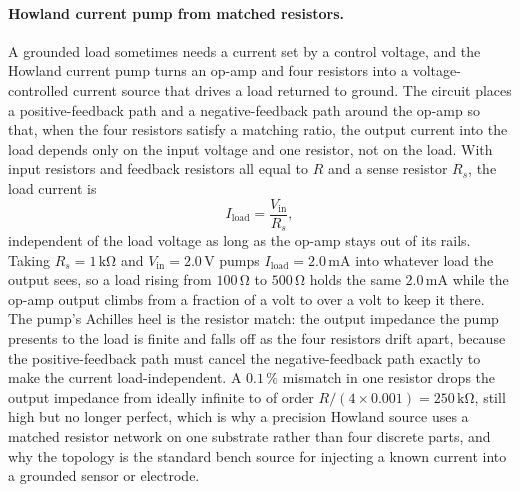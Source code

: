 \paragraph{Howland current pump from matched resistors.}
A grounded load sometimes needs a current set by a control voltage, and the
Howland current pump turns an op-amp and four resistors into a
voltage-controlled current source that drives a load returned to ground. The
circuit places a positive-feedback path and a negative-feedback path around the
op-amp so that, when the four resistors satisfy a matching ratio, the output
current into the load depends only on the input voltage and one resistor, not on
the load. With input resistors and feedback resistors all equal to $R$ and a
sense resistor $R_s$, the load current is
\[
I_{\text{load}} = \frac{V_{\text{in}}}{R_s},
\]
independent of the load voltage as long as the op-amp stays out of its rails.
Taking $R_s = 1\,\si{\kilo\ohm}$ and $V_{\text{in}} = 2.0\,\si{\volt}$ pumps
$I_{\text{load}} = 2.0\,\si{\milli\ampere}$ into whatever load the output sees,
so a load rising from $100\,\si{\ohm}$ to $500\,\si{\ohm}$ holds the same
$2.0\,\si{\milli\ampere}$ while the op-amp output climbs from a fraction of a
volt to over a volt to keep it there. The pump's Achilles heel is the resistor
match: the output impedance the pump presents to the load is finite and falls off
as the four resistors drift apart, because the positive-feedback path must cancel
the negative-feedback path exactly to make the current load-independent. A
$0.1\,\%$ mismatch in one resistor drops the output impedance from ideally
infinite to of order $R/(4\times 0.001) = 250\,\si{\kilo\ohm}$, still high but no
longer perfect, which is why a precision Howland source uses a matched resistor
network on one substrate rather than four discrete parts, and why the topology is
the standard bench source for injecting a known current into a grounded sensor or
electrode.

